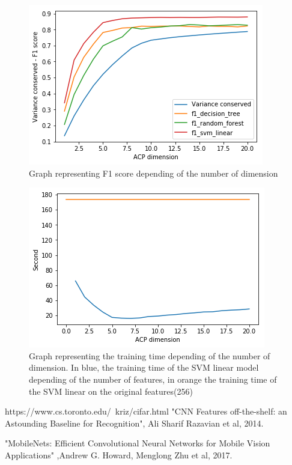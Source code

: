 \documentclass[10pt, a4paper, twocolumn]{article} %
\begin{document}
\begin{figure}[H]
\center
	\includegraphics[scale=0.4]{graph_1.png} %
	\caption{\label{fig:graph_1}Graph representing F1 score depending of the number of dimension} %
\end{figure}

\begin{figure}[H]
\center
	\includegraphics[scale=0.4]{graph_2.png} %
	\caption{\label{fig:graph_2}Graph representing the training time depending of the number of dimension. In blue, the training time of the SVM linear model depending of the number of features, in orange the training time of the SVM linear on the original features(256)} %
\end{figure}



\begin{thebibliography}{abcde}
	 https://www.cs.toronto.edu/~kriz/cifar.html
     "CNN Features off-the-shelf: an Astounding Baseline for Recognition", Ali Sharif Razavian et al, 2014.
 
     "MobileNets: Efficient Convolutional Neural Networks for Mobile Vision Applications" ,Andrew G. Howard, Menglong Zhu et al, 2017.
\end{thebibliography}

\end{document}
